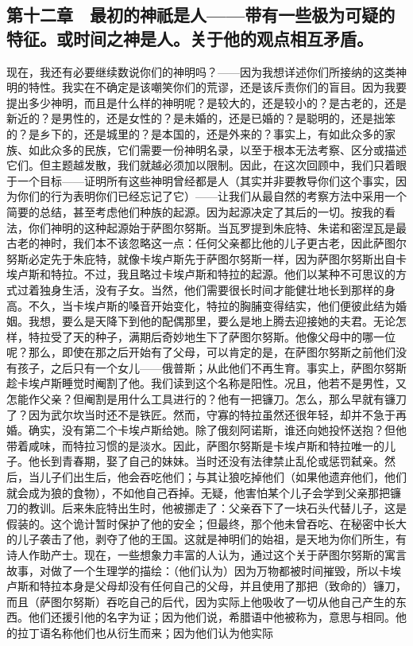 
\subsection{第十二章　最初的神祇是人——带有一些极为可疑的特征。或时间之神是人。关于他的观点相互矛盾。}

现在，我还有必要继续数说你们的神明吗？——因为我想详述你们所接纳的这类神明的特性。我实在不确定是该嘲笑你们的荒谬，还是该斥责你们的盲目。因为我要提出多少神明，而且是什么样的神明呢？是较大的，还是较小的？是古老的，还是新近的？是男性的，还是女性的？是未婚的，还是已婚的？是聪明的，还是拙笨的？是乡下的，还是城里的？是本国的，还是外来的？事实上，有如此众多的家族、如此众多的民族，它们需要一份神明名录，以至于根本无法考察、区分或描述它们。但主题越发散，我们就越必须加以限制。因此，在这次回顾中，我们只着眼于一个目标——证明所有这些神明曾经都是人（其实并非要教导你们这个事实，因为你们的行为表明你们已经忘记了它）——让我们从最自然的考察方法中采用一个简要的总结，甚至考虑他们种族的起源。因为起源决定了其后的一切。按我的看法，你们神明的这种起源始于萨图尔努斯。当瓦罗提到朱庇特、朱诺和密涅瓦是最古老的神时，我们本不该忽略这一点：任何父亲都比他的儿子更古老，因此萨图尔努斯必定先于朱庇特，就像卡埃卢斯先于萨图尔努斯一样，因为萨图尔努斯出自卡埃卢斯和特拉。不过，我且略过卡埃卢斯和特拉的起源。他们以某种不可思议的方式过着独身生活，没有子女。当然，他们需要很长时间才能健壮地长到那样的身高。不久，当卡埃卢斯的嗓音开始变化，特拉的胸脯变得结实，他们便彼此结为婚姻。我想，要么是天降下到他的配偶那里，要么是地上腾去迎接她的夫君。无论怎样，特拉受了天的种子，满期后奇妙地生下了萨图尔努斯。他像父母中的哪一位呢？那么，即使在那之后开始有了父母，可以肯定的是，在萨图尔努斯之前他们没有孩子，之后只有一个女儿——俄普斯；从此他们不再生育。事实上，萨图尔努斯趁卡埃卢斯睡觉时阉割了他。我们读到这个名称是阳性。况且，他若不是男性，又怎能作父亲？但阉割是用什么工具进行的？他有一把镰刀。怎么，那么早就有镰刀了？因为武尔坎当时还不是铁匠。然而，守寡的特拉虽然还很年轻，却并不急于再婚。确实，没有第二个卡埃卢斯给她。除了俄刻阿诺斯，谁还向她投怀送抱？但他带着咸味，而特拉习惯的是淡水。因此，萨图尔努斯是卡埃卢斯和特拉唯一的儿子。他长到青春期，娶了自己的妹妹。当时还没有法律禁止乱伦或惩罚弑亲。然后，当儿子们出生后，他会吞吃他们；与其让狼吃掉他们（如果他遗弃他们，他们就会成为狼的食物），不如他自己吞掉。无疑，他害怕某个儿子会学到父亲那把镰刀的教训。后来朱庇特出生时，他被挪走了：父亲吞下了一块石头代替儿子，这是假装的。这个诡计暂时保护了他的安全；但最终，那个他未曾吞吃、在秘密中长大的儿子袭击了他，剥夺了他的王国。这就是神明们的始祖，是天地为你们所生，有诗人作助产士。现在，一些想象力丰富的人认为，通过这个关于萨图尔努斯的寓言故事，对做了一个生理学的描绘：（他们认为）因为万物都被时间摧毁，所以卡埃卢斯和特拉本身是父母却没有任何自己的父母，并且使用了那把（致命的）镰刀，而且（萨图尔努斯）吞吃自己的后代，因为实际上他吸收了一切从他自己产生的东西。他们还援引他的名字为证；因为他们说，希腊语中他被称为，意思与相同。他的拉丁语名称他们也从衍生而来；因为他们认为他实际